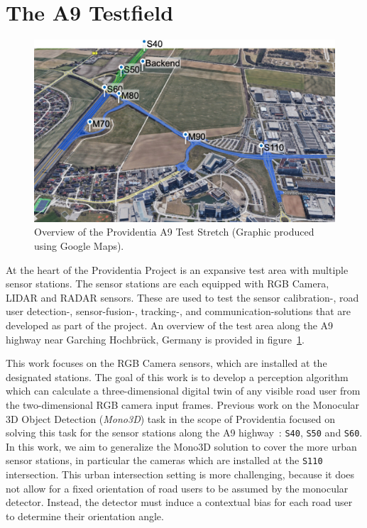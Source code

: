 
\section{The A9 Testfield}
\label{sec:a9testfield}

\begin{figure}[htb]
    \includegraphics[width=\linewidth]{figures/teststrecke-gesamt}
    \caption{Overview of the Providentia A9 Test Stretch (Graphic produced using Google Maps).}
    \label{fig:providentia-test-area}
\end{figure}

At the heart of the Providentia Project is an expansive test area with multiple sensor stations.
The sensor stations are each equipped with RGB Camera, LIDAR and RADAR sensors.
These are used to test the sensor calibration-, road user detection-, sensor-fusion-, tracking-, and communication-solutions that are developed as part of the project.
An overview of the test area along the A9 highway near Garching Hochbrück, Germany is provided in figure~\ref{fig:providentia-test-area}.

This work focuses on the RGB Camera sensors, which are installed at the designated stations.
The goal of this work is to develop a perception algorithm which can calculate a three-dimensional digital twin of any visible road user from the two-dimensional RGB camera input frames.
Previous work on the Monocular 3D Object Detection (\textit{Mono3D}) task in the scope of Providentia focused on solving this task for the sensor stations along the A9 highway~\cite{leonthesis}: \texttt{S40}, \texttt{S50} and \texttt{S60}.
In this work, we aim to generalize the Mono3D solution to cover the more urban sensor stations, in particular the cameras which are installed at the \texttt{S110} intersection.
This urban intersection setting is more challenging, because it does not allow for a fixed orientation of road users to be assumed by the monocular detector.
Instead, the detector must induce a contextual bias for each road user to determine their orientation angle.

